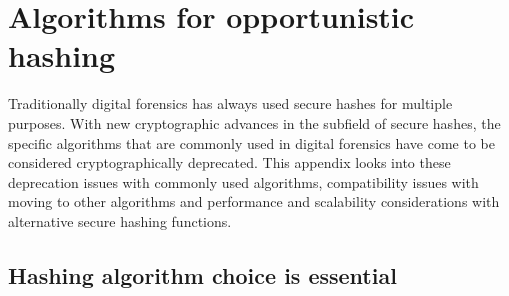 \chapter{Algorithms for opportunistic hashing}
Traditionally digital forensics has always used secure hashes for multiple purposes. With new cryptographic advances in the subfield of secure hashes, the specific algorithms that are commonly used in digital forensics have come to be considered cryptographically deprecated. This appendix looks into these deprecation issues with commonly used algorithms, compatibility issues with moving to other algorithms and performance and scalability considerations with alternative secure hashing functions.

\section{Hashing algorithm choice is essential} 
